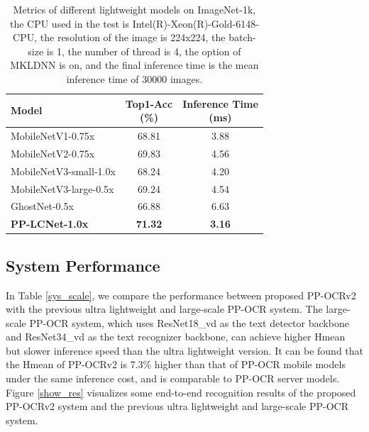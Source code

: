 \documentclass[letterpaper]{article} %
\begin{document}
\begin{table}[h]
\begin{center}
\begin{tabular}{l|c|c}
\hline
Model & \shortstack{Top1-Acc\\(\%)} & \shortstack{Inference Time\\(ms)} \\
\hline
MobileNetV1-0.75x & 68.81 & 3.88 \\
MobileNetV2-0.75x & 69.83 & 4.56\\
MobileNetV3-small-1.0x & 68.24 & 4.20 \\
MobileNetV3-large-0.5x & 69.24 & 4.54\\
GhostNet-0.5x & 66.88 & 6.63\\
\textbf{PP-LCNet-1.0x} & \textbf{71.32} & \textbf{3.16}\\
\hline
\end{tabular}
\end{center}
\caption{Metrics of different lightweight models on ImageNet-1k, the CPU used in the test is Intel(R)-Xeon(R)-Gold-6148-CPU, the resolution of the image is 224x224, the batch-size is 1, the number of thread is 4, the option of MKLDNN is on, and the final inference time is the mean inference time of 30000 images.}
\label{PP-LCNet-Ablation}
\end{table}

\subsection{System Performance}
In Table \ref{sys_scale}, we compare the performance between proposed PP-OCRv2 with the previous ultra lightweight and large-scale PP-OCR system. The large-scale PP-OCR system, which uses ResNet18\_vd as the text detector backbone and ResNet34\_vd as the text recognizer backbone, can achieve higher Hmean but slower inference speed than the ultra lightweight version. It can be found that the Hmean of PP-OCRv2 is 7.3\% higher than that of PP-OCR mobile models under the same inference cost, and is comparable to PP-OCR server models. Figure \ref{show_res} visualizes some end-to-end recognition results of the proposed PP-OCRv2 system and the previous ultra lightweight and large-scale PP-OCR system. 
\end{document}
